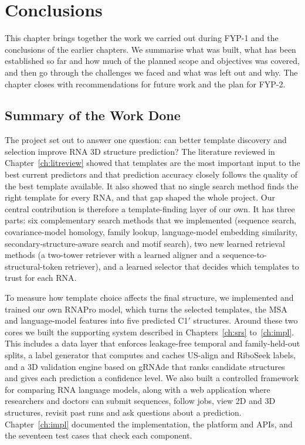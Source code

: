 \documentclass{FastFyp}
\begin{document}
\clearpage
\chapter{Conclusions}
\label{ch:conclusions}
This chapter brings together the work we carried out during FYP-1 and the conclusions of the earlier chapters. We summarise what was built, what has been established so far and how much of the planned scope and objectives was covered, and then go through the challenges we faced and what was left out and why. The chapter closes with recommendations for future work and the plan for FYP-2.

\section{Summary of the Work Done}
The project set out to answer one question: can better template discovery and selection improve RNA 3D structure prediction? The literature reviewed in Chapter~\ref{ch:litreview} showed that templates are the most important input to the best current predictors and that prediction accuracy closely follows the quality of the best template available. It also showed that no single search method finds the right template for every RNA, and that gap shaped the whole project. Our central contribution is therefore a template-finding layer of our own. It has three parts: six complementary search methods that we implemented (sequence search, covariance-model homology, family lookup, language-model embedding similarity, secondary-structure-aware search and motif search), two new learned retrieval methods (a two-tower retriever with a learned aligner and a sequence-to-structural-token retriever), and a learned selector that decides which templates to trust for each RNA.

To measure how template choice affects the final structure, we implemented and trained our own RNAPro model, which turns the selected templates, the MSA and language-model features into five predicted C1$'$ structures. Around these two cores we built the supporting system described in Chapters~\ref{ch:srs} to~\ref{ch:impl}. This includes a data layer that enforces leakage-free temporal and family-held-out splits, a label generator that computes and caches US-align and RiboSeek labels, and a 3D validation engine based on gRNAde that ranks candidate structures and gives each prediction a confidence level. We also built a controlled framework for comparing RNA language models, along with a web application where researchers and doctors can submit sequences, follow jobs, view 2D and 3D structures, revisit past runs and ask questions about a prediction. Chapter~\ref{ch:impl} documented the implementation, the platform and APIs, and the seventeen test cases that check each component.
\end{document}
